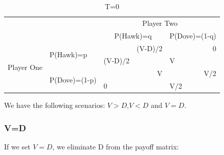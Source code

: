 \documentclass[a4paper, 11pt]{article}
\begin{document}
\begin{table}[H]
\centering
\caption{T=0}
\begin{tabular}{cl|ll|ll|}
\multicolumn{1}{l}{}                             &                                & \multicolumn{4}{c|}{Player Two}                                             \\ \cline{3-6} 
\multicolumn{1}{l}{}                             &                                & \multicolumn{2}{c|}{P(Hawk)=q}         & \multicolumn{2}{c|}{P(Dove)=(1-q)} \\ \hline
\multicolumn{1}{c|}{\multirow{4}{*}{Player One}} & \multirow{2}{*}{P(Hawk)=p}     &         & \multicolumn{1}{r|}{(V-D)/2} &       & \multicolumn{1}{r|}{0}     \\
\multicolumn{1}{c|}{}                            &                                & (V-D)/2 &                              & V     &                            \\ \cline{2-6} 
\multicolumn{1}{c|}{}                            & \multirow{2}{*}{P(Dove)=(1-p)} &         & \multicolumn{1}{r|}{V}       &       & \multicolumn{1}{r|}{V/2}   \\
\multicolumn{1}{c|}{}                            &                                & 0       &                              & V/2   &                            \\ \hline
\end{tabular}
\end{table}

We have the following scenarios: $V>D$,$V<D$ and $V=D$.

\subsubsection{V=D}

If we set $V=D$, we eliminate D from the payoff matrix:
\end{document}
